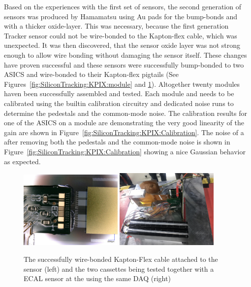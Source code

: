 Based on the experiences with the first set of sensors, the second generation of sensors was produced by Hamamatsu 
using Au pads for the \KPIX bump-bonds and with a thicker oxide-layer. This was necessary, because the first generation Tracker sensor could not be 
wire-bonded to the Kapton-flex cable, which was unexpected. It was then discovered, that the sensor oxide layer was not strong enough 
to allow wire bonding without damaging the sensor itself.
These changes have proven successful and these sensors were successfully bump-bonded to two \KPIX ASICS and wire-bonded to their Kapton-flex pigtails 
(See Figures~\ref{fig:SiliconTracking:KPIX:module} and \ref{fig:SiliconTracking:KPIX:Assembly}). Altogether twenty modules haven been successfully assembled and tested. 
Each module and \KPIX needs to be calibrated using the builtin calibration circuitry and dedicated noise runs to determine the pedestals and the 
common-mode noise.  The calibration results for one of the \KPIX ASICS on a module are demonstrating the very good  linearity of the 
\KPIX gain are shown in  Figure~\ref{fig:SiliconTracking:KPIX:Calibration}. The noise of a \KPIX after removing both the pedestals and the common-mode noise 
is shown in Figure~\ref{fig:SiliconTracking:KPIX:Calibration} showing a nice Gaussian behavior as expected.

\begin{figure}[htbp]
\includegraphics[width=0.45\textwidth]{Tracker/KPIX/KPIX_wirebonding.jpg}
\includegraphics[width=0.45\textwidth]{Tracker/KPIX/TB201902_tracker_Ecal_2.jpg}
\caption{The successfully wire-bonded Kapton-Flex cable attached to the sensor (left) and the two \LYCORIS cassettes being tested together with a \SID ECAL sensor at the \DIITBF using the same DAQ (right)}
\label{fig:SiliconTracking:KPIX:Assembly}
\end{figure}


